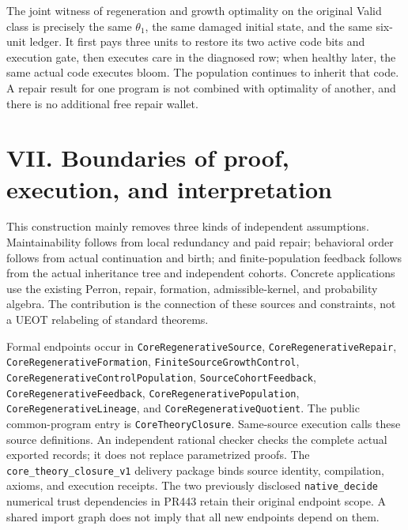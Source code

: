 \documentclass[
  english,
  11pt,
  oneside]{book}
\begin{document}
The joint witness of regeneration and growth optimality on the original Valid class is precisely the same \(\theta_1\), the same damaged initial state, and the same six-unit ledger. It first pays three units to restore its two active code bits and execution gate, then executes care in the diagnosed row; when healthy later, the same actual code executes bloom. The population continues to inherit that code. A repair result for one program is not combined with optimality of another, and there is no additional free repair wallet.

\section{VII. Boundaries of proof, execution, and interpretation}\label{vii.-boundaries-of-proof-execution-and-interpretation}

This construction mainly removes three kinds of independent assumptions. Maintainability follows from local redundancy and paid repair; behavioral order follows from actual continuation and birth; and finite-population feedback follows from the actual inheritance tree and independent cohorts. Concrete applications use the existing Perron, repair, formation, admissible-kernel, and probability algebra. The contribution is the connection of these sources and constraints, not a UEOT relabeling of standard theorems.

Formal endpoints occur in \nolinkurl{CoreRegenerativeSource}, \nolinkurl{CoreRegenerativeRepair}, \nolinkurl{CoreRegenerativeFormation}, \nolinkurl{FiniteSourceGrowthControl}, \nolinkurl{CoreRegenerativeControlPopulation}, \nolinkurl{SourceCohortFeedback}, \nolinkurl{CoreRegenerativeFeedback}, \nolinkurl{CoreRegenerativePopulation}, \nolinkurl{CoreRegenerativeLineage}, and \nolinkurl{CoreRegenerativeQuotient}. The public common-program entry is \nolinkurl{CoreTheoryClosure}. Same-source execution calls these source definitions. An independent rational checker checks the complete actual exported records; it does not replace parametrized proofs. The \nolinkurl{core_theory_closure_v1} delivery package binds source identity, compilation, axioms, and execution receipts. The two previously disclosed \nolinkurl{native_decide} numerical trust dependencies in PR443 retain their original endpoint scope. A shared import graph does not imply that all new endpoints depend on them.
\end{document}
